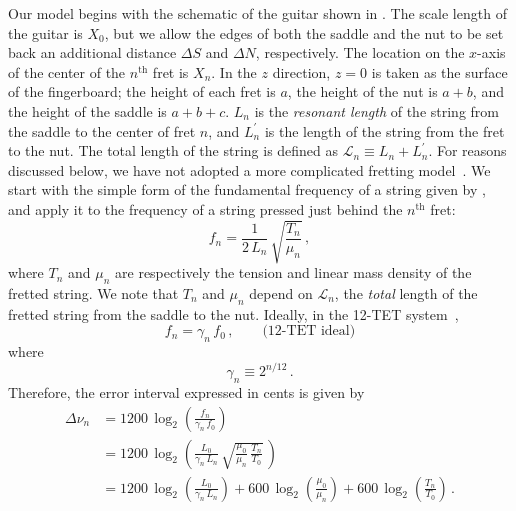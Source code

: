Our model begins with the schematic of the guitar shown in . The scale length of the guitar is $X_0$, but we allow the edges of both the saddle and the nut to be set back an additional distance $\Delta S$ and $\Delta N$, respectively. The location on the $x$-axis of the center of the $n^\textrm{th}$ fret is $X_n$. In the $z$ direction, $z = 0$ is taken as the surface of the fingerboard; the height of each fret is $a$, the height of the nut is $a + b$, and the height of the saddle is $a + b + c$. $L_n$ is the \emph{resonant length} of the string from the saddle to the center of fret $n$, and $L^\prime_n$ is the length of the string from the fret to the nut. The total length of the string is defined as $\mathcal{L}_n \equiv L_n + L^\prime_n$. For reasons discussed below, we have not adopted a more complicated fretting model~\cite{ref:byers1996cgi,ref:varieschi2010icf}. We start with the simple form of the fundamental frequency of a string given by , and apply it to the frequency of a string pressed just behind the $n^\mathrm{th}$ fret:
 \begin{equation} \label{eqn:f_n_def}
f_n = \frac{1}{2\, L_n}\, \sqrt{\frac{T_n}{\mu_n}}\, ,
 \end{equation}
where $T_n$ and $\mu_n$ are respectively the tension and linear mass density of the fretted string. We note that $T_n$ and $\mu_n$ depend on $\mathcal{L}_n$, the \emph{total} length of the fretted string from the saddle to the nut. Ideally, in the 12-TET system~\cite{ref:durfee2015pms},
 \begin{equation} \label{eqn:f_n_tet}
f_n = \gamma_n\, f_0\, , \qquad \textrm{(12-TET~ideal)}
 \end{equation}
where
 \begin{equation} \label{eqn:gamme_n_def}
\gamma_n \equiv 2^{n / 12}\, .
 \end{equation}
Therefore, the error interval expressed in cents is given by
 \begin{equation}\label{eqn:error_def}
 \begin{split}
\Delta \nu_n &= 1200\, \log_2\left( \frac{f_n}{\gamma_n\, f_0} \right) \\
&= 1200\, \log_2 \left( \frac{L_0}{\gamma_n\, L_n}\, \sqrt{\frac{\mu_0}{\mu_n}\, \frac{T_n}{T_0}}\, \right) \\
&= 1200\, \log_2 \left( \frac{L_0}{\gamma_n\, L_n} \right) + 600\, \log_2 \left(  \frac{\mu_0}{\mu_n} \right) + 600\, \log_2 \left( \frac{T_n}{T_0} \right)\, .
 \end{split}
 \end{equation}

